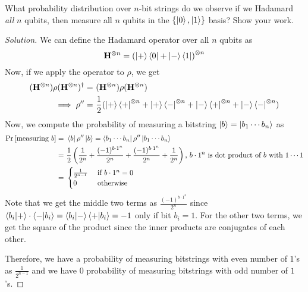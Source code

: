 \begin{solution}[label=ques:2c]
  \begin{question}
    What probability distribution over $n$-bit strings do we observe if
we Hadamard \textit{all} $n$ qubits, then measure all $n$ qubits in the $\{\ket{0},\ket{1}\}$
basis? Show your work.
  \end{question}
  \tcblower{}
  \begin{proof}[Solution]
    We can define the Hadamard operator over all $n$ qubits as
    \begin{equation}
      \mathbf{H}^{\otimes n} = \left(\ket{+}\bra{0} + \ket{-}\bra{1}\right)^{\otimes n}
      \label{eq:hadn}
    \end{equation}
    Now, if we apply the operator to $\rho$, we get
    \begin{equation}
      \begin{split}
        (\bfH^{\otimes n})\rho(\bfH^{\otimes n})^\dagger = &\ (\bfH^{\otimes n})\rho(\bfH^{\otimes n})\\
        \implies \rho'' = &\ \frac{1}{2}(\ketbra{+}^{\otimes n} + \ketbraa{+}{-}^{\otimes n} + \ketbraa{-}{+}^{\otimes n} + \ketbra{-}^{\otimes n})
      \end{split}
      \label{eq:hadnrho}
    \end{equation}
    Now, we compute the probability of measuring a bitstring $\ket{b} = \ket{b_1\cdots b_n}$ as
    \begin{equation}
      \begin{split}
        \Pr\left[ \text{measuring }b \right] = &\ \bra{b}\rho''\ket{b} = \bra{b_1\cdots b_n}\rho''\ket{b_1\cdots b_n}\\
        = &\ \frac{1}{2}\left(\frac{1}{2^n} + \frac{(-1)^{b\cdot 1^n}}{2^n} + \frac{(-1)^{b\cdot 1^n}}{2^n} + \frac{1}{2^n}\right)\text{, $b\cdot1^n$ is dot product of $b$ with $1\cdots 1$}\\
        = &\ \begin{cases}
          \frac{1}{2^{n-1}} &\text{ if }b\cdot 1^n = 0\\
          0 &\text{ otherwise}
        \end{cases}
      \end{split}
      \label{eq:hadnmeasrho}
    \end{equation}
    Note that we get the middle two terms as $\frac{(-1)^{b\cdot 1^n}}{2^n}$ since $\braket{b_i|+}\cdot\braket{-|b_i} = \braket{b_i|-}\braket{+|b_i} = -1$ only if bit $b_i = 1$. For the other two terms, we get the square of the product since the inner products are conjugates of each other.\par
    Therefore, we have a probability of measuring bitstrings with even number of $1$'s as $\frac{1}{2^{n-1}}$ and we have $0$ probability of measuring bitstrings with odd number of $1$'s.
  \end{proof}
\end{solution}

